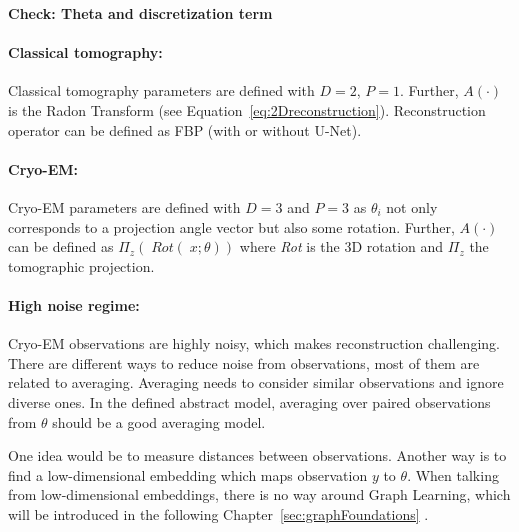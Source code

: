 \textbf{Check: Theta and discretization term}

\paragraph{Classical tomography:}

Classical tomography parameters are defined with $D=2$, $P=1$.
Further, $A(\cdot)$ is the Radon Transform (see Equation~\ref{eq:2Dreconstruction}).
Reconstruction operator can be defined as FBP (with or without U-Net).

\paragraph{Cryo-EM:}
Cryo-EM parameters are defined with $D=3$ and $P=3$ as $\theta_i$ not only corresponds to
a projection angle vector but also some rotation.
Further, $A(\cdot)$ can be defined as $\Pi_z \left(\; \textit{Rot}(\;x; \theta) \right)$ 
where \textit{Rot} is the 3D rotation and $\Pi_z$ the tomographic projection.

\paragraph{High noise regime:}
Cryo-EM observations are highly noisy, which makes reconstruction challenging. 
There are different ways to reduce noise from observations, most of them are related to averaging. 
Averaging needs to consider similar observations and ignore diverse ones. 
In the defined abstract model, averaging over paired observations from $\theta$ should be a good averaging model.

One idea would be to measure distances between observations.
Another way is to find a low-dimensional embedding which maps observation $y$ to $\theta$.
When talking from low-dimensional embeddings, there is no way around Graph Learning, which will be introduced
in the following Chapter~\ref{sec:graphFoundations} \textit{}.
